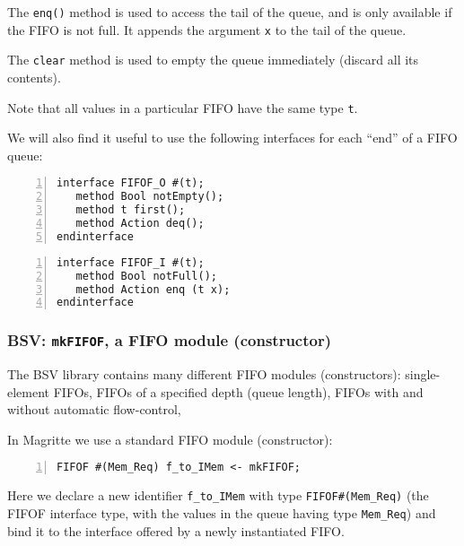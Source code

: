 The \verb|enq()| method is used to access the tail of the queue, and
is only available if the FIFO is not full.  It appends the argument
\verb|x| to the tail of the queue.

The \verb|clear| method is used to empty the queue immediately
(discard all its contents).

Note that all values in a particular FIFO have the same type \verb|t|.

We will also find it useful to use the following interfaces for each
``end'' of a FIFO queue:


\begin{Verbatim}[frame=single, numbers=left]
interface FIFOF_O #(t);
   method Bool notEmpty();
   method t first();
   method Action deq();
endinterface
\end{Verbatim}


\begin{Verbatim}[frame=single, numbers=left]
interface FIFOF_I #(t);
   method Bool notFull();
   method Action enq (t x);
endinterface
\end{Verbatim}


\subsubsection{BSV: {\tt mkFIFOF}, a FIFO module (constructor)}


The BSV library contains many different FIFO modules (constructors):
single-element FIFOs, FIFOs of a specified depth (queue length), FIFOs
with and without automatic flow-control, {\etc}

In Magritte we use a standard FIFO module (constructor):

\begin{Verbatim}[frame=single, numbers=left]
   FIFOF #(Mem_Req) f_to_IMem <- mkFIFOF;
\end{Verbatim}

Here we declare a new identifier \verb|f_to_IMem| with type
\verb|FIFOF#(Mem_Req)| (the FIFOF interface type, with the values in
the queue having type \verb|Mem_Req|) and bind it to the interface
offered by a newly instantiated FIFO.



